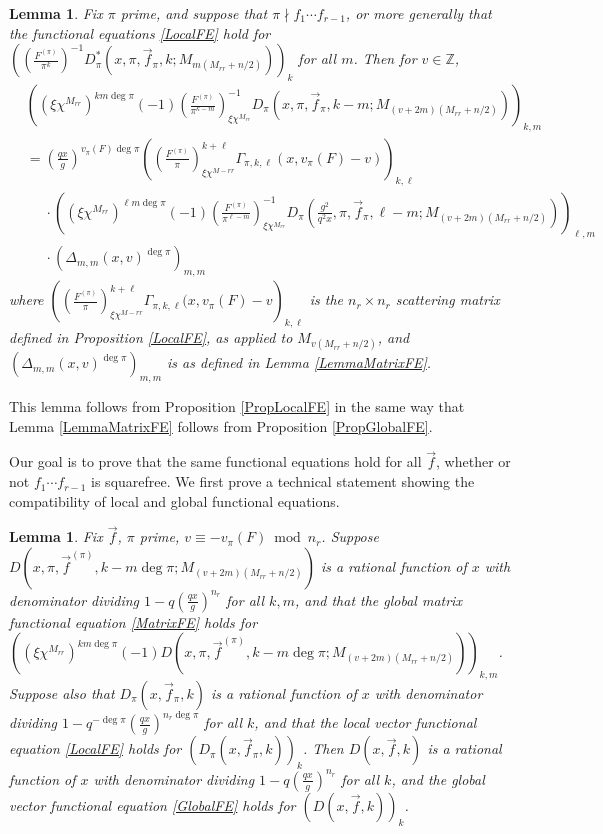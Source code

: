 \documentclass[11pt,letterpaper]{article}
\newtheorem{lemma}[theorem]{Lemma}
\theoremstyle{definition}
\theoremstyle{remark}
\numberwithin{equation}{section}
\theoremstyle{dotless}
\newcommand{\Z}{\mathbb{Z}}
\newcommand{\res}[2]{\left(\frac{#1}{#2}\right)}
\begin{document}
\begin{lemma}\label{LemmaLocalMatrixFE}
Fix $\pi$ prime, and suppose that $\pi \nmid f_1\cdots f_{r-1}$, or more generally that the functional equations \eqref{LocalFE} hold for $\left(\res{F^{(\pi)}}{\pi^k}^{-1} D_{\pi}^*(x, \pi, \vec{f}_{\pi}, k; M_{m(M_{rr}+n/2)}) \right)_k$ for all $m$. Then for $v \in \Z$,
\begin{equation}\label{LocalMatrixFE}
\begin{split}
&\left( (\xi \chi^{M_{rr}})^{k m \deg \pi}(-1)\res{F^{(\pi)}}{\pi^{k-m}}_{\xi \chi^{M_{rr}}}^{-1} D_{\pi}(x, \pi, \vec{f}_{\pi}, k-m; M_{(v+2m)(M_{rr}+n/2)}) \right)_{k,m} \\
&= \left(\frac{qx}{g}\right)^{v_{\pi}(F) \deg \pi} \left( \res{F^{(\pi)}}{\pi}_{\xi \chi^{M-{rr}}}^{k+\ell} \Gamma_{\pi, k, \ell}(x, v_{\pi}(F)-v) \right)_{k, \ell} \\
&\phantom{=} \cdot \left( (\xi \chi^{M_{rr}})^{\ell m \deg \pi}(-1) \res{F^{(\pi)}}{\pi^{\ell-m}}_{\xi \chi^{M_{rr}}}^{-1} D_{\pi}\left(\frac{g^2}{q^2x}, \pi, \vec{f}_{\pi}, \ell-m; M_{(v+2m)(M_{rr}+n/2)} \right) \right)_{\ell, m}\\
&\phantom{=}\cdot\left(\Delta_{m,m}(x, v)^{\deg \pi} \right)_{m,m} 
\end{split}
\end{equation}
where $\left( \res{F^{(\pi)}}{\pi}_{\xi \chi^{M-{rr}}}^{k+\ell} \Gamma_{\pi, k, \ell}(x, v_{\pi}(F)-v \right)_{k, \ell}$ is the $n_r \times n_r$ scattering matrix defined in Proposition \ref{LocalFE}, as applied to $M_{v(M_{rr}+n/2)}$, and $\left(\Delta_{m,m}(x, v)^{\deg \pi} \right)_{m,m} $ is as defined in Lemma \ref{LemmaMatrixFE}.
\end{lemma}

This lemma follows from Proposition \ref{PropLocalFE} in the same way that Lemma \ref{LemmaMatrixFE} follows from Proposition \ref{PropGlobalFE}.

Our goal is to prove that the same functional equations hold for all $\vec{f}$, whether or not $f_1\cdots f_{r-1}$ is squarefree. We first prove a technical statement showing the compatibility of local and global functional equations.

\begin{lemma} \label{LocalImpliesGlobal}
Fix $\vec{f}$, $\pi$ prime, $v\equiv -v_{\pi}(F) \bmod n_r$. Suppose $D(x, \pi, \vec{f}^{(\pi)}, k-m\deg \pi; M_{(v+2m)(M_{rr}+n/2)})$ is a rational function of $x$ with denominator dividing $1-q\left(\frac{qx}{g}\right)^{n_r}$ for all $k, m$, and that the global matrix functional equation \eqref{MatrixFE} holds for$\left( (\xi \chi^{M_{rr}})^{k m \deg \pi}(-1)D(x, \pi, \vec{f}^{(\pi)}, k-m\deg \pi; M_{(v+2m)(M_{rr}+n/2)}) \right)_{k,m}$. Suppose also that $D_{\pi}(x, \vec{f}_\pi, k)$ is a rational function of $x$ with denominator dividing $1-q^{-\deg \pi}\left(\frac{qx}{g}\right)^{n_r\deg \pi}$ for all $k$, and that the local vector functional equation \eqref{LocalFE} holds for $\left( D_{\pi}(x, \vec{f}_\pi, k) \right)_k$. Then $D(x, \vec{f}, k)$ is a rational function of $x$ with denominator dividing $1-q\left(\frac{qx}{g}\right)^{n_r}$ for all $k$, and the global vector functional equation \eqref{GlobalFE} holds for $\left( D(x, \vec{f}, k) \right)_k$.
\end{lemma}
\end{document}

